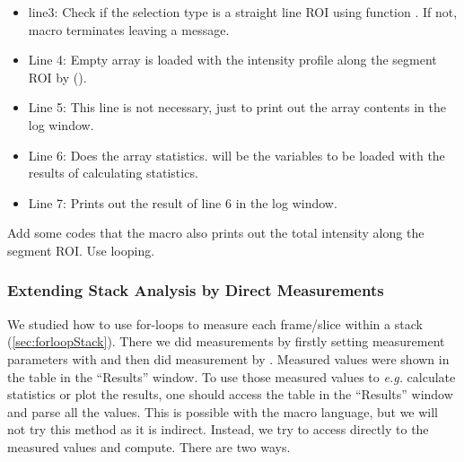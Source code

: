 \begin{itemize}
\item line3:  Check if the selection type is a straight line ROI using function . If not, macro terminates leaving a message.
\begin{indentCom}
\end{indentCom}
\item Line 4: Empty array  is loaded with the intensity profile along the segment ROI by ().
\item Line 5: This line is not necessary, just to print out the array contents in the log window. 
\item Line 6: Does the array statistics.   will be the variables to be loaded with the results of calculating statistics. 
\item Line 7: Prints out the result of line 6 in the log window. 
\end{itemize}


\begin{indentexercise}{1}
\item Add some codes that the macro also prints out the total intensity along the segment ROI. Use looping. \\
\end{indentexercise}

\subsubsection{Extending Stack Analysis by Direct Measurements}

We studied how to use for-loops to measure each frame/slice within a stack (\ref{sec:forloopStack}). There we did measurements by firstly setting measurement parameters with  and then did measurement by . Measured values were shown in the table in the ``Results'' window. To use those measured values to \textit{e.g.} calculate statistics or plot the results, one should access the table in the ``Results'' window and parse all the values. This is possible with the macro language, but we will not try this method as it is indirect. Instead, we try to access directly to the measured values and compute. There are two ways. 

